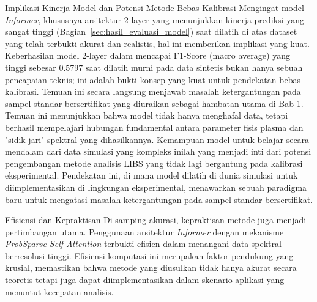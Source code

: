 \par Implikasi Kinerja Model dan Potensi Metode Bebas Kalibrasi Mengingat model \textit{Informer}, khususnya arsitektur 2-layer yang menunjukkan kinerja prediksi yang sangat tinggi (Bagian~\ref{sec:hasil_evaluasi_model}) saat dilatih di atas dataset yang telah terbukti akurat dan realistis, hal ini memberikan implikasi yang kuat. Keberhasilan model 2-layer dalam mencapai F1-Score (macro average) yang tinggi sebesar 0.5797 saat dilatih murni pada data sintetis bukan hanya sebuah pencapaian teknis; ini adalah bukti konsep yang kuat untuk pendekatan bebas kalibrasi. Temuan ini secara langsung menjawab masalah ketergantungan pada sampel standar bersertifikat yang diuraikan sebagai hambatan utama di Bab 1. Temuan ini menunjukkan bahwa model tidak hanya menghafal data, tetapi berhasil mempelajari hubungan fundamental antara parameter fisis plasma dan "sidik jari" spektral yang dihasilkannya. Kemampuan model untuk belajar secara mendalam dari data simulasi yang kompleks inilah yang menjadi inti dari potensi pengembangan metode analisis LIBS yang tidak lagi bergantung pada kalibrasi eksperimental. Pendekatan ini, di mana model dilatih di dunia simulasi untuk diimplementasikan di lingkungan eksperimental, menawarkan sebuah paradigma baru untuk mengatasi masalah ketergantungan pada sampel standar bersertifikat.

\par Efisiensi dan Kepraktisan Di samping akurasi, kepraktisan metode juga menjadi pertimbangan utama. Penggunaan arsitektur \textit{Informer} dengan mekanisme \textit{ProbSparse Self-Attention} terbukti efisien dalam menangani data spektral berresolusi tinggi. Efisiensi komputasi ini merupakan faktor pendukung yang krusial, memastikan bahwa metode yang diusulkan tidak hanya akurat secara teoretis tetapi juga dapat diimplementasikan dalam skenario aplikasi yang menuntut kecepatan analisis.

